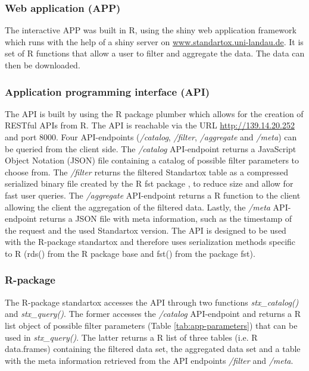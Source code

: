 \subsubsection*{Web application (APP)}
The interactive APP was built in R, using the shiny web application framework which runs with the help of a shiny server \citep{chang_shiny_2018} on \url{www.standartox.uni-landau.de}. It is set of R functions that allow a user to filter and aggregate the data. The data can then be downloaded.

\subsubsection*{Application programming interface (API)}
The API is built by using the R package plumber \citep{trestletechnologyllc_plumber_2018} which allows for the creation of RESTful APIs from R. The API is reachable via the URL \url{http://139.14.20.252} and port 8000. Four API-endpoints (\textit{/catalog}, \textit{/filter}, \textit{/aggregate} and \textit{/meta}) can be queried from the client side. The \textit{/catalog} API-endpoint returns a JavaScript Object Notation (JSON) file containing a catalog of possible filter parameters to choose from. The \textit{/filter} returns the filtered Standartox table as a compressed serialized binary file created by the R fst package \citep{klik_fst_2019}, to reduce size and allow for fast user queries. The \textit{/aggregate} API-endpoint returns a R function to the client allowing the client the aggregation of the filtered data. Lastly, the \textit{/meta} API-endpoint returns a JSON file with meta information, such as the timestamp of the request and the used Standartox version. The API is designed to be used with the R-package standartox and therefore uses serialization methods specific to R (rds() from the R package base and fst() from the package fst).

\subsubsection*{R-package}
The R-package standartox accesses the API through two functions \textit{stx\_catalog()} and \textit{stx\_query()}. The former accesses the \textit{/catalog} API-endpoint and returns a R list object of possible filter parameters (Table \ref{tab:app-parameters}) that can be used in \textit{stx\_query()}. The latter returns a R list of three tables (i.e. R data.frames) containing the filtered data set, the aggregated data set and a table with the meta information retrieved from the API endpoints \textit{/filter} and \textit{/meta}.

